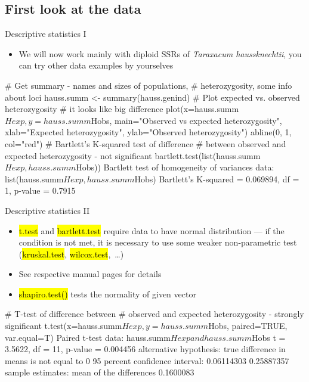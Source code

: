 \documentclass[compress, ucs, xelatex, 11pt, xcolor=svgnames,
	hyperref={
		bookmarks=true,
		unicode=true,
		colorlinks=true,
		pdftitle={Molecular data in R},
		plainpages=false,
		pdfauthor={Vojtech Zeisek},
		pdfsubject={Course about phylogeny and evolution in R},
		pdfcreator={XeLaTeX},
		pdfkeywords={R, evolution, phylogeny, molecular data},
		linkcolor=Tomato,
		anchorcolor=SaddleBrown,
		citecolor=Goldenrod,
		filecolor=DarkMagenta,
		menucolor=Sienna,
		urlcolor=DarkTurquoise,
		pdftex},
	url={hyphens, lowtilde} %
	]{beamer}
\renewcommand{\texttt}[1]{\hl{\ttfamily #1}}
\begin{document}
\subsection{First look at the data}

\begin{frame}[fragile]{Descriptive statistics I}
	\label{popgenindx}
	\begin{itemize}
		\item We will now work mainly with diploid SSRs of \textit{Taraxacum haussknechtii}, you can try other data examples by yourselves
	\end{itemize}
	\begin{spluscode}
    # Get summary - names and sizes of populations,
    # heterozygosity, some info about loci
    hauss.summ <- summary(hauss.genind)
    # Plot expected vs. observed heterozygosity
    # it looks like big difference
    plot(x=hauss.summ$Hexp, y=hauss.summ$Hobs,
      main="Observed vs expected heterozygosity",
      xlab="Expected heterozygosity", ylab="Observed heterozygosity")
    abline(0, 1, col="red")
    # Bartlett's K-squared test of difference
    # between observed and expected heterozygosity - not significant
    bartlett.test(list(hauss.summ$Hexp, hauss.summ$Hobs))
                  Bartlett test of homogeneity of variances
    data:  list(hauss.summ$Hexp, hauss.summ$Hobs)
    Bartlett's K-squared = 0.069894, df = 1, p-value = 0.7915
	\end{spluscode}
\end{frame}

\begin{frame}[fragile]{Descriptive statistics II}
	\begin{itemize}
		\item \texttt{t.test} and \texttt{bartlett.test} require data to have normal distribution --- if the condition is not met, it is necessary to use some weaker non-parametric test (\texttt{kruskal.test}, \texttt{wilcox.test},~\ldots)
		\item See respective manual pages for details
		\item \texttt{shapiro.test()} tests the normality of given vector
	\end{itemize}
	\begin{spluscode}
    # T-test of difference between
    # observed and expected heterozygosity - strongly significant
    t.test(x=hauss.summ$Hexp, y=hauss.summ$Hobs, paired=TRUE, var.equal=T)
                 Paired t-test
    data:  hauss.summ$Hexp and hauss.summ$Hobs
    t = 3.5622, df = 11, p-value = 0.004456
    alternative hypothesis: true difference in means is not equal to 0
    95 percent confidence interval:
     0.06114303 0.25887357
    sample estimates:
    mean of the differences
                  0.1600083
	\end{spluscode}
\end{frame}
\end{document}
